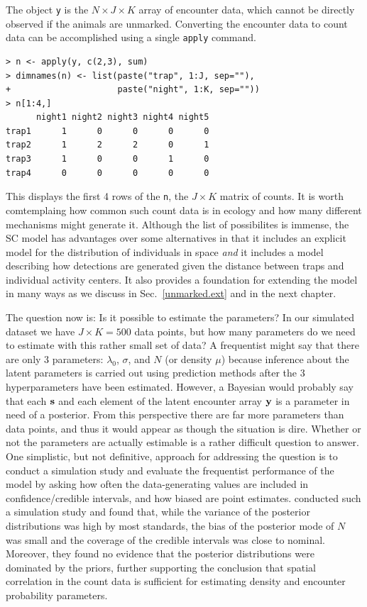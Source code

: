 The object \verb+y+ is the $N \times J \times K$ array of encounter
data, which cannot be directly observed if the animals are unmarked.
Converting the encounter data to count data can be accomplished using a single
\verb+apply+ command.
\begin{small}
\begin{verbatim}
> n <- apply(y, c(2,3), sum)
> dimnames(n) <- list(paste("trap", 1:J, sep=""),
+                     paste("night", 1:K, sep=""))
> n[1:4,]
      night1 night2 night3 night4 night5
trap1      1      0      0      0      0
trap2      1      2      2      0      1
trap3      1      0      0      1      0
trap4      0      0      0      0      0
\end{verbatim}
\end{small}
This displays the first 4 rows of the \verb+n+, the $J \times K$
matrix of counts. It is worth comtemplaing how common such count data
is in
ecology and how many different mechanisms might generate it. Although
the list of possibilites is immense, the SC model has advantages over
some alternatives
in that it includes an explicit
model for the distribution of individuals in space \textit{and} it
includes a model describing how detections are generated given the
distance between traps and individual activity centers. It also
provides a foundation for extending the model in many ways as we
discuss in Sec.~\ref{unmarked.ext} and in the next chapter.

The question now is: Is it possible to estimate the parameters? In our
simulated dataset we have $J \times K = 500$ data points, but how many
parameters do we need to estimate with this rather small set of data?
A frequentist might say that there are only 3 parameters: $\lambda_0$,
$\sigma$, and $N$ (or density $\mu$) because inference about the
latent parameters is carried out using prediction methods after the 3
hyperparameters have been estimated. However, a Bayesian would
probably say that each $\bf s$ and each element of the latent
encounter array $\bf y$ is a parameter in need of a posterior. From
this perspective there are far more parameters than data points, and
thus it would appear as though the situation is dire. Whether or not
the parameters are actually estimable is a rather difficult question
to answer. One simplistic, but not definitive, approach for addressing
the question is to conduct a simulation study and evaluate the
frequentist performance of the model by asking how often the
data-generating values are included in confidence/credible intervals,
and how biased are point estimates. \citet{chandler_royle:2012}
conducted such a simulation study and found that, while the variance
of the posterior distributions was high by most standards, the bias of
the posterior mode of $N$ was small and the coverage of the credible
intervals was close to nominal. Moreover, they found no evidence that the
posterior distributions were dominated by the priors, further
supporting the conclusion that spatial correlation in the count data
is sufficient for estimating density and encounter probability
parameters. %

